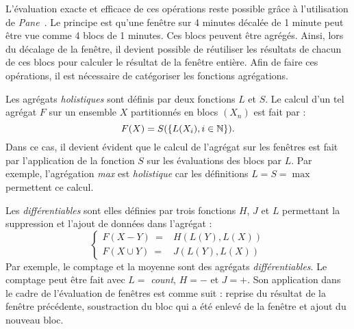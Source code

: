 L'évaluation exacte et efficace de ces opérations reste possible grâce à l'utilisation de \textit{Pane}~\cite{Li:pane}. Le principe est qu'une fenêtre sur 4 minutes décalée de 1 minute peut être vue comme 4 blocs de 1 minutes. Ces blocs peuvent être agrégés. Ainsi, lors du décalage de la fenêtre, il devient possible de réutiliser les résultats de chacun de ces blocs pour calculer le résultat de la fenêtre entière. Afin de faire ces opérations, il est nécessaire de catégoriser les fonctions agrégations. 

Les agrégats \textit{holistiques} sont définis par deux fonctions $L$ et $S$. Le calcul d'un tel agrégat $F$ sur un ensemble $X$ partitionnés en blocs $(X_n)$ est fait par : $$F(X) = S(\{L(X_i), i\in \mathbb{N}\}).$$ 
Dans ce cas, il devient évident que le calcul de l'agrégat sur les fenêtres est fait par l'application de la fonction $S$ sur les évaluations des blocs par $L$. Par exemple, l'agrégation \textit{max} est \textit{holistique} car les définitions $L=S=\max$ permettent ce calcul.

Les \textit{différentiables} sont elles définies par trois fonctions $H$, $J$ et $L$ permettant la suppression et l'ajout de données dans l'agrégat : $$\begin{cases} F(X-Y) \ =& H(L(Y), L(X)) \\ F(X\cup Y)\ =& J(L(Y), L(X))\end{cases}$$
Par exemple, le comptage et la moyenne sont des agrégats \textit{différentiables}. Le comptage peut être fait avec $L=$ \textit{count}, $H=-$ et $J=+$. Son application dans le cadre de l'évaluation de fenêtres est comme suit : reprise du résultat de la fenêtre précédente, soustraction du bloc qui a été enlevé de la fenêtre et ajout du nouveau bloc.

